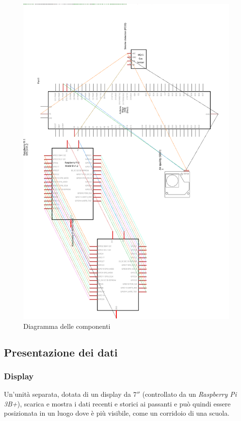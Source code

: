 \documentclass[12pt, a4paper]{article}
\begin{document}
	\begin{figure}[H]
		\centering
		\includegraphics[height=0.95\textheight]{schema.png}
		\caption{Diagramma delle componenti}
		\label{fig:schema}
	\end{figure}
	\clearpage
	
	\subsection{Presentazione dei dati}
	\subsubsection{Display}
	Un'unità separata, dotata di un display da $7''$ (controllato da un \emph{Raspberry Pi 3B+}), scarica e mostra i dati recenti e storici ai passanti e può quindi essere posizionata in un luogo dove è più visibile, come un corridoio di una scuola.\\
	
\end{document}
